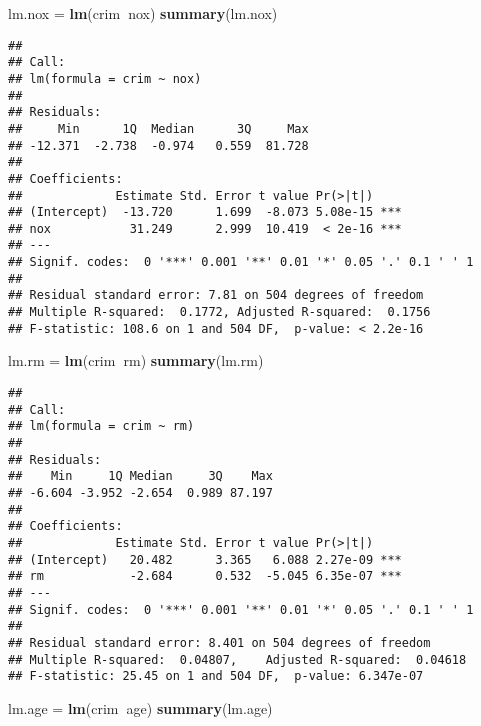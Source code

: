\documentclass[]{article}
\newenvironment{Shaded}{\begin{snugshade}}{\end{snugshade}}
\newcommand{\KeywordTok}[1]{\textcolor[rgb]{0.13,0.29,0.53}{\textbf{#1}}}
\newcommand{\NormalTok}[1]{#1}
\newcommand{\OperatorTok}[1]{\textcolor[rgb]{0.81,0.36,0.00}{\textbf{#1}}}
\newcommand{\StringTok}[1]{\textcolor[rgb]{0.31,0.60,0.02}{#1}}
\begin{document}
\begin{Shaded}
\begin{Highlighting}[]
\NormalTok{lm.nox =}\StringTok{ }\KeywordTok{lm}\NormalTok{(crim}\OperatorTok{~}\NormalTok{nox)}
\KeywordTok{summary}\NormalTok{(lm.nox)}
\end{Highlighting}
\end{Shaded}

\begin{verbatim}
## 
## Call:
## lm(formula = crim ~ nox)
## 
## Residuals:
##     Min      1Q  Median      3Q     Max 
## -12.371  -2.738  -0.974   0.559  81.728 
## 
## Coefficients:
##             Estimate Std. Error t value Pr(>|t|)    
## (Intercept)  -13.720      1.699  -8.073 5.08e-15 ***
## nox           31.249      2.999  10.419  < 2e-16 ***
## ---
## Signif. codes:  0 '***' 0.001 '**' 0.01 '*' 0.05 '.' 0.1 ' ' 1
## 
## Residual standard error: 7.81 on 504 degrees of freedom
## Multiple R-squared:  0.1772, Adjusted R-squared:  0.1756 
## F-statistic: 108.6 on 1 and 504 DF,  p-value: < 2.2e-16
\end{verbatim}

\begin{Shaded}
\begin{Highlighting}[]
\NormalTok{lm.rm =}\StringTok{ }\KeywordTok{lm}\NormalTok{(crim}\OperatorTok{~}\NormalTok{rm)}
\KeywordTok{summary}\NormalTok{(lm.rm)}
\end{Highlighting}
\end{Shaded}

\begin{verbatim}
## 
## Call:
## lm(formula = crim ~ rm)
## 
## Residuals:
##    Min     1Q Median     3Q    Max 
## -6.604 -3.952 -2.654  0.989 87.197 
## 
## Coefficients:
##             Estimate Std. Error t value Pr(>|t|)    
## (Intercept)   20.482      3.365   6.088 2.27e-09 ***
## rm            -2.684      0.532  -5.045 6.35e-07 ***
## ---
## Signif. codes:  0 '***' 0.001 '**' 0.01 '*' 0.05 '.' 0.1 ' ' 1
## 
## Residual standard error: 8.401 on 504 degrees of freedom
## Multiple R-squared:  0.04807,    Adjusted R-squared:  0.04618 
## F-statistic: 25.45 on 1 and 504 DF,  p-value: 6.347e-07
\end{verbatim}

\begin{Shaded}
\begin{Highlighting}[]
\NormalTok{lm.age =}\StringTok{ }\KeywordTok{lm}\NormalTok{(crim}\OperatorTok{~}\NormalTok{age)}
\KeywordTok{summary}\NormalTok{(lm.age)}
\end{Highlighting}
\end{Shaded}
\end{document}
